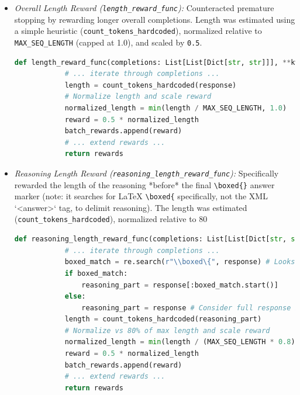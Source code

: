 \documentclass[11pt]{article}
\begin{document}
\begin{itemize}
\begin{itemize}
\begin{itemize}
        \item \textit{Overall Length Reward (\texttt{length\_reward\_func}):} Counteracted premature stopping by rewarding longer overall completions. Length was estimated using a simple heuristic (\texttt{count\_tokens\_hardcoded}), normalized relative to \texttt{MAX\_SEQ\_LENGTH} (capped at 1.0), and scaled by \texttt{0.5}.
        \begin{lstlisting}[language=Python, caption={Overall length reward logic (Phi)}, label={lst:phi_len}]
        def length_reward_func(completions: List[List[Dict[str, str]]], **kwargs):
            # ... iterate through completions ...
            length = count_tokens_hardcoded(response)
            # Normalize length and scale reward
            normalized_length = min(length / MAX_SEQ_LENGTH, 1.0)
            reward = 0.5 * normalized_length
            batch_rewards.append(reward)
            # ... extend rewards ...
            return rewards
        \end{lstlisting}

        
        \item \textit{Reasoning Length Reward (\texttt{reasoning\_length\_reward\_func}):} Specifically rewarded the length of the reasoning *before* the final \verb|\boxed{}| answer marker (note: it searches for LaTeX \verb|\boxed{| specifically, not the XML `<answer>` tag, to delimit reasoning). The length was estimated (\texttt{count\_tokens\_hardcoded}), normalized relative to 80%
        \begin{lstlisting}[language=Python, caption={Reasoning length reward logic (Phi)}, label={lst:phi_reasonlen}]
        def reasoning_length_reward_func(completions: List[List[Dict[str, str]]], **kwargs):
            # ... iterate through completions ...
            boxed_match = re.search(r"\\boxed\{", response) # Looks for LaTeX box start
            if boxed_match:
                reasoning_part = response[:boxed_match.start()]
            else:
                reasoning_part = response # Consider full response if no box
            length = count_tokens_hardcoded(reasoning_part)
            # Normalize vs 80% of max length and scale reward
            normalized_length = min(length / (MAX_SEQ_LENGTH * 0.8), 1.0)
            reward = 0.5 * normalized_length
            batch_rewards.append(reward)
            # ... extend rewards ...
            return rewards
        \end{lstlisting}


\end{itemize}
\end{itemize}
\end{itemize}
\end{document}
